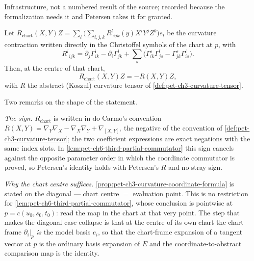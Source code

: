 \begin{lemma}
  \label{lem:curvature-chart-bridge}
  \leanok
  Infrastructure, not a numbered result of the source; recorded because the
  formalization needs it and Petersen takes it for granted.

  Let $R_{\mathrm{chart}}(X,Y)Z=\sum_l\big(\sum_{i,j,k}R^l{}_{ijk}(y)X^iY^jZ^k\big)e_l$
  be the curvature contraction written directly in the Christoffel symbols of the
  chart at $p$, with
  \[
    R^l{}_{ijk}=\partial_j\Gamma^l_{ik}-\partial_i\Gamma^l_{jk}
      +\sum_s\big(\Gamma^s_{ik}\Gamma^l_{js}-\Gamma^s_{jk}\Gamma^l_{is}\big).
  \]
  Then, at the centre of that chart,
  \[
    R_{\mathrm{chart}}(X,Y)Z=-R(X,Y)Z,
  \]
  with $R$ the abstract (Koszul) curvature tensor of \cref{def:pet-ch3-curvature-tensor}.

  Two remarks on the shape of the statement.

  \emph{The sign.} $R_{\mathrm{chart}}$ is written in do Carmo's convention
  $R(X,Y)=\nabla_Y\nabla_X-\nabla_X\nabla_Y+\nabla_{[X,Y]}$, the negative of the
  convention of \cref{def:pet-ch3-curvature-tensor}; the two coefficient
  expressions are exact negations with the same index slots. In
  \cref{lem:pet-ch6-third-partial-commutator} this sign cancels against the
  opposite parameter order in which the coordinate commutator is proved, so
  Petersen's identity holds with Petersen's $R$ and no stray sign.

  \emph{Why the chart centre suffices.}
  \cref{prop:pet-ch3-curvature-coordinate-formula} is stated on the diagonal —
  chart centre $=$ evaluation point. This is no restriction for
  \cref{lem:pet-ch6-third-partial-commutator}, whose conclusion is pointwise at
  $p=c(u_0,s_0,t_0)$: read the map in the chart at that very point. The step that
  makes the diagonal case collapse is that at the centre of its own chart the
  chart frame $\partial_i|_p$ \emph{is} the model basis $e_i$, so that the
  chart-frame expansion of a tangent vector at $p$ is the ordinary basis expansion
  of $E$ and the coordinate-to-abstract comparison map is the identity.
\end{lemma}

